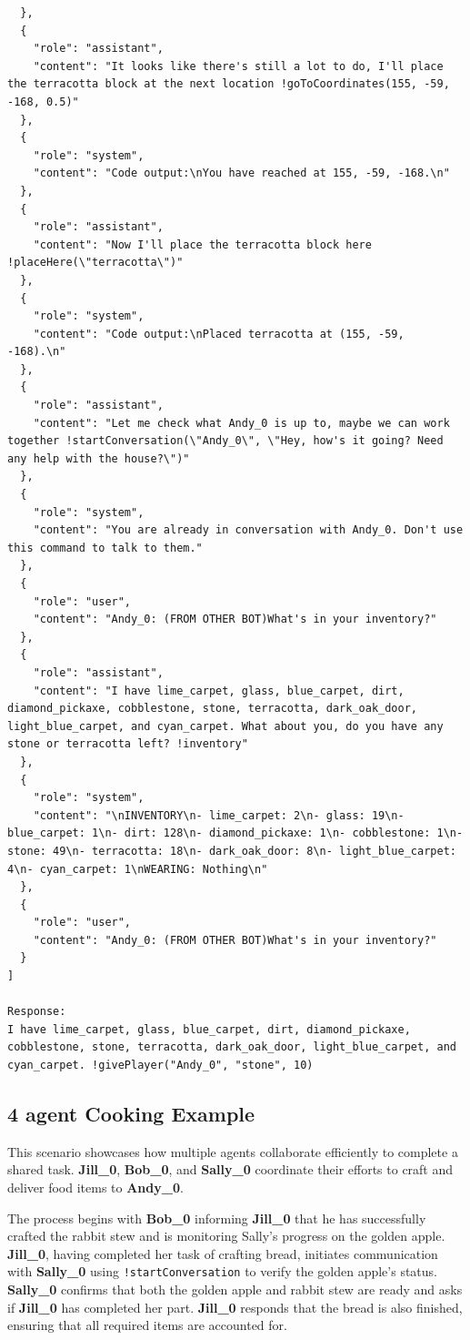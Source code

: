 \documentclass{article}
\begin{document}
\begin{lstlisting}
  },
  {
    "role": "assistant",
    "content": "It looks like there's still a lot to do, I'll place the terracotta block at the next location !goToCoordinates(155, -59, -168, 0.5)"
  },
  {
    "role": "system",
    "content": "Code output:\nYou have reached at 155, -59, -168.\n"
  },
  {
    "role": "assistant",
    "content": "Now I'll place the terracotta block here !placeHere(\"terracotta\")"
  },
  {
    "role": "system",
    "content": "Code output:\nPlaced terracotta at (155, -59, -168).\n"
  },
  {
    "role": "assistant",
    "content": "Let me check what Andy_0 is up to, maybe we can work together !startConversation(\"Andy_0\", \"Hey, how's it going? Need any help with the house?\")"
  },
  {
    "role": "system",
    "content": "You are already in conversation with Andy_0. Don't use this command to talk to them."
  },
  {
    "role": "user",
    "content": "Andy_0: (FROM OTHER BOT)What's in your inventory?"
  },
  {
    "role": "assistant",
    "content": "I have lime_carpet, glass, blue_carpet, dirt, diamond_pickaxe, cobblestone, stone, terracotta, dark_oak_door, light_blue_carpet, and cyan_carpet. What about you, do you have any stone or terracotta left? !inventory"
  },
  {
    "role": "system",
    "content": "\nINVENTORY\n- lime_carpet: 2\n- glass: 19\n- blue_carpet: 1\n- dirt: 128\n- diamond_pickaxe: 1\n- cobblestone: 1\n- stone: 49\n- terracotta: 18\n- dark_oak_door: 8\n- light_blue_carpet: 4\n- cyan_carpet: 1\nWEARING: Nothing\n"
  },
  {
    "role": "user",
    "content": "Andy_0: (FROM OTHER BOT)What's in your inventory?"
  }
]

Response:
I have lime_carpet, glass, blue_carpet, dirt, diamond_pickaxe, cobblestone, stone, terracotta, dark_oak_door, light_blue_carpet, and cyan_carpet. !givePlayer("Andy_0", "stone", 10)
\end{lstlisting}
\clearpage

\subsection{4 agent Cooking Example} \label{sec: 4-agent-example}

This scenario showcases how multiple agents collaborate efficiently to complete a shared task. \textbf{Jill\_0}, \textbf{Bob\_0}, and \textbf{Sally\_0} coordinate their efforts to craft and deliver food items to \textbf{Andy\_0}.

The process begins with \textbf{Bob\_0} informing \textbf{Jill\_0} that he has successfully crafted the rabbit stew and is monitoring Sally’s progress on the golden apple. \textbf{Jill\_0}, having completed her task of crafting bread, initiates communication with \textbf{Sally\_0} using \texttt{!startConversation} to verify the golden apple’s status. \textbf{Sally\_0} confirms that both the golden apple and rabbit stew are ready and asks if \textbf{Jill\_0} has completed her part. \textbf{Jill\_0} responds that the bread is also finished, ensuring that all required items are accounted for.
\end{document}
